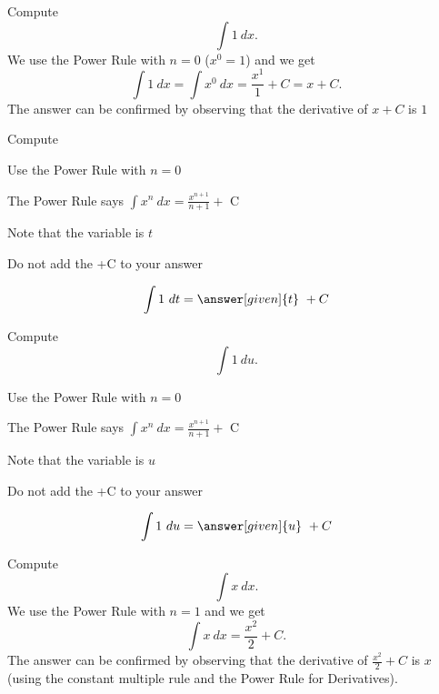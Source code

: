 \documentclass{ximera}
\begin{document}
\begin{example} %
Compute $$\int 1 \ dx.$$
We use the Power Rule with $n= 0$  ($x^0 = 1$) and we get
\[\int 1 \ dx = \int x^0 \ dx =\frac{x^1}{1} + C = x+C.\] The answer can be confirmed by observing that the 
derivative of $x + C$ is $1$ 
\end{example}

\begin{problem} %
Compute 


\begin{hint}
Use the Power Rule with $n=0$
\end{hint}
\begin{hint}
The Power Rule says $\int x^n \ dx = \frac{x^{n+1}}{n+1} +$ C
\end{hint}
\begin{hint}
Note that the variable is $t$
\end{hint}
\begin{hint}
\begin{center}
Do not add the +C to your answer
\end{center}
\end{hint}

\[
\int 1 \ dt =
\answer[given]{t} \ + C
\]
\end{problem}


\begin{problem} %
Compute 
\[
\int 1 \ du.
\]


\begin{hint}
Use the Power Rule with $n=0$
\end{hint}
\begin{hint}
The Power Rule says $\int x^n \ dx = \frac{x^{n+1}}{n+1} +$ C
\end{hint}
\begin{hint}
Note that the variable is $u$
\end{hint}
\begin{hint}
\begin{center}
Do not add the +C to your answer
\end{center}
\end{hint}

\[
\int 1 \ du =
\answer[given]{u} \ + C
\]
\end{problem}


\begin{example} %
Compute $$\int x \ dx.$$
We use the Power Rule with $n= 1$ and we get
\[\int x \ dx = \frac{x^2}{2} + C.\] The answer can be confirmed by observing that the 
derivative of $\frac{x^2}{2} +C$ is $x$ (using the constant multiple rule and the Power Rule for Derivatives).
\end{example}
\end{document}
